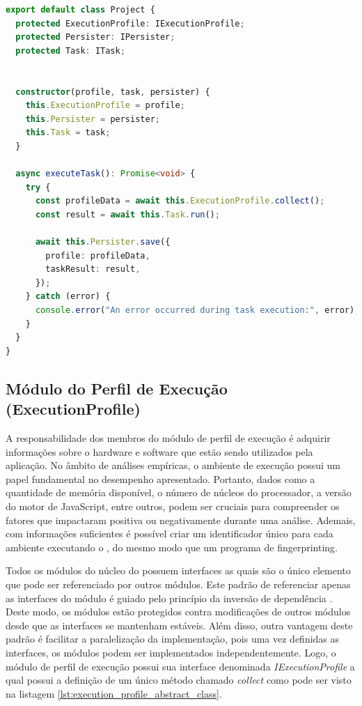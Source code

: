 \documentclass[12pt]{tcc}
\begin{document}
\begin{minipage}{\linewidth}
\begin{lstlisting}[label={lst:project_class}, caption={Fragmento de códido da classe \emph{Project}.}, language=TypeScript, breaklines=true]
export default class Project {
  protected ExecutionProfile: IExecutionProfile;
  protected Persister: IPersister;
  protected Task: ITask;


  constructor(profile, task, persister) {
    this.ExecutionProfile = profile;
    this.Persister = persister;
    this.Task = task;
  }

  async executeTask(): Promise<void> {
    try {
      const profileData = await this.ExecutionProfile.collect();
      const result = await this.Task.run();
  
      await this.Persister.save({
        profile: profileData,
        taskResult: result,
      });
    } catch (error) {
      console.error("An error occurred during task execution:", error);
    }
  }
}
\end{lstlisting}
\end{minipage}


	\subsection{Módulo do Perfil de Execução (ExecutionProfile)}
	\label{subsection:modulo-execution-profile}

	
	A responsabilidade dos membros do módulo de perfil de execução é adquirir informações sobre o hardware e software que estão sendo utilizados pela aplicação.
	No âmbito de análises empíricas, o ambiente de execução possui um papel fundamental no desempenho apresentado.
	Portanto, dados como a quantidade de memória disponível, o número de núcleos do processador, a versão do motor de JavaScript, entre outros, podem ser cruciais para compreender os fatores que impactaram positiva ou negativamente durante uma análise.
	Ademais, com informações suficientes é possível criar um identificador único para cada ambiente executando o , do mesmo modo que um programa de fingerprinting.
	
	Todos os módulos do núcleo do  possuem interfaces as quais são o único elemento que pode ser referenciado por outros módulos.
	Este padrão de referenciar apenas as interfaces do módulo é guiado pelo princípio da inversão de dependência \citep{MartinCleanArchtecture2017}.
	Deste modo, os módulos estão protegidos contra modificações de outros módulos desde que as interfaces se mantenham estáveis.
	Além disso, outra vantagem deste padrão é facilitar a paralelização da implementação, pois uma vez definidas as interfaces, os módulos podem ser implementados independentemente.
	Logo, o módulo de perfil de execução possui sua interface denominada \emph{IExecutionProfile} a qual possui a definição de um único método chamado \emph{collect} como pode ser visto na listagem \ref{lst:execution_profile_abstract_class}.
\end{document}
